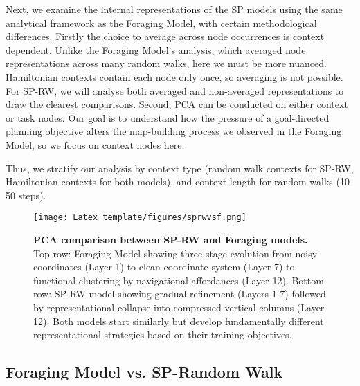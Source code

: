 Next, we examine the internal representations of the SP models using the same analytical framework as the Foraging Model, with certain methodological differences. Firstly the choice to average across node occurrences is context dependent. Unlike the Foraging Model's analysis, which averaged node representations across many random walks, here we must be more nuanced. Hamiltonian contexts contain each node only once, so averaging is not possible. For SP-RW, we will analyse both averaged and non-averaged representations to draw the clearest comparisons. Second, PCA can be conducted on either context or task nodes. Our goal is to understand how the pressure of a goal-directed planning objective alters the map-building process we observed in the Foraging Model, so we focus on context nodes here.

Thus, we stratify our analysis by context type (random walk contexts for SP-RW, Hamiltonian contexts for both models), and context length for random walks (10--50 steps). 


\begin{figure}[h]
\centering
\texttt{[image: Latex template/figures/sprwvsf.png]}
\caption[PCA comparison between SP-RW and Foraging models.]{\textbf{PCA comparison between SP-RW and Foraging models.} Top row: Foraging Model showing three-stage evolution from noisy coordinates (Layer 1) to clean coordinate system (Layer 7) to functional clustering by navigational affordances (Layer 12). Bottom row: SP-RW model showing gradual refinement (Layers 1-7) followed by representational collapse into compressed vertical columns (Layer 12). Both models start similarly but develop fundamentally different representational strategies based on their training objectives.}
\label{fig:sp_pca_comparison}
\end{figure}

\subsection{Foraging Model vs. SP-Random Walk}

